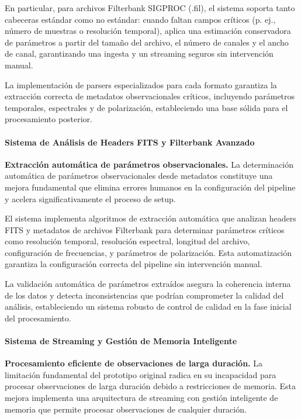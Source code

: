 En particular, para archivos Filterbank SIGPROC (.fil), el sistema soporta tanto cabeceras estándar como no estándar: cuando faltan campos críticos (p. ej., número de muestras o resolución temporal), aplica una estimación conservadora de parámetros a partir del tamaño del archivo, el número de canales y el ancho de canal, garantizando una ingesta y un streaming seguros sin intervención manual.

La implementación de parsers especializados para cada formato garantiza la extracción correcta de metadatos observacionales críticos, incluyendo parámetros temporales, espectrales y de polarización, estableciendo una base sólida para el procesamiento posterior.

\paragraph{Sistema de Análisis de Headers FITS y Filterbank Avanzado}

\noindent\textbf{Extracción automática de parámetros observacionales.} La determinación automática de parámetros observacionales desde metadatos constituye una mejora fundamental que elimina errores humanos en la configuración del pipeline y acelera significativamente el proceso de setup.

El sistema implementa algoritmos de extracción automática que analizan headers FITS y metadatos de archivos Filterbank para determinar parámetros críticos como resolución temporal, resolución espectral, longitud del archivo, configuración de frecuencias, y parámetros de polarización. Esta automatización garantiza la configuración correcta del pipeline sin intervención manual.

La validación automática de parámetros extraídos asegura la coherencia interna de los datos y detecta inconsistencias que podrían comprometer la calidad del análisis, estableciendo un sistema robusto de control de calidad en la fase inicial del procesamiento.

\paragraph{Sistema de Streaming y Gestión de Memoria Inteligente}

\noindent\textbf{Procesamiento eficiente de observaciones de larga duración.} La limitación fundamental del prototipo original radica en su incapacidad para procesar observaciones de larga duración debido a restricciones de memoria. Esta mejora implementa una arquitectura de streaming con gestión inteligente de memoria que permite procesar observaciones de cualquier duración.

